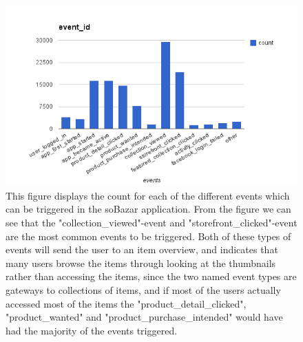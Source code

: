     \begin{figure}[H]
        \includegraphics[width=5in]{image/event_id.png}
        \centering
        \caption[Count for different events]{This figure displays the count for each of the different events which can be triggered in the soBazar application.
        From the figure we can see that the "collection\_viewed"-event and "storefront\_clicked"-event are the most common events to be triggered.
        Both of these types of events will send the user to an item overview, and indicates that many users browse the items through looking at the thumbnails rather than accessing the items, since the two named event types are gateways to collections of items, and if most of the users actually accessed most of the items the "product\_detail\_clicked", "product\_wanted" and "product\_purchase\_intended" would have had the majority of the events triggered.}
    \end{figure}

